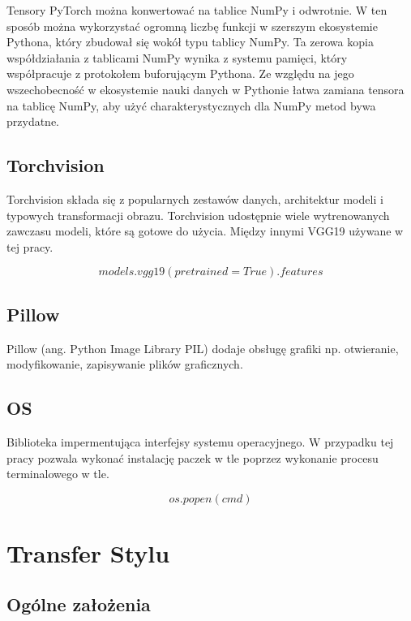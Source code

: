 \documentclass[brudnopis]{xmgr}
\begin{document}
Tensory PyTorch można konwertować na tablice NumPy i odwrotnie. W ten sposób można wykorzystać ogromną liczbę funkcji w szerszym ekosystemie Pythona, który zbudował się wokół typu tablicy NumPy. Ta zerowa kopia współdziałania z tablicami NumPy wynika z systemu pamięci, który współpracuje z protokołem buforującym Pythona. 
Ze względu na jego wszechobecność w ekosystemie nauki danych w Pythonie łatwa zamiana tensora na tablicę NumPy, aby użyć charakterystycznych dla NumPy metod bywa przydatne.

    \section{Torchvision\label{s:dsssl}}
    
    Torchvision składa się z popularnych zestawów danych, architektur modeli i typowych transformacji obrazu. Torchvision udostępnie wiele wytrenowanych zawczasu modeli, które są gotowe do użycia. Między innymi VGG19 używane w tej pracy.

\begin{equation}
models.vgg19(pretrained=True).features
\end{equation}


    \section{Pillow\label{s:dsssl}}
    
   Pillow (ang. Python Image Library PIL) dodaje obsługę grafiki np. otwieranie, modyfikowanie, zapisywanie plików graficznych.
    
        \section{OS\label{s:dsssl}}
        
        Biblioteka impermentująca  interfejsy systemu operacyjnego. W przypadku tej pracy pozwala wykonać instalację paczek w tle poprzez wykonanie procesu terminalowego w tle. 

\begin{equation}
os.popen(cmd)
\end{equation}


\chapter{Transfer Stylu }

\section{Ogólne założenia\label{s:dsssl}}
\end{document}
